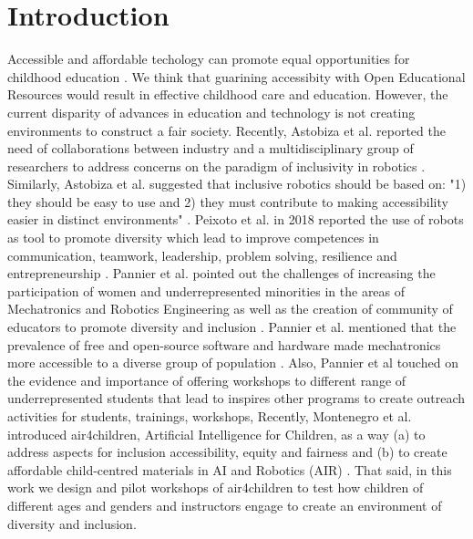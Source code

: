 \documentclass[conference]{IEEEtran}
\begin{document}
\section{Introduction}
Accessible and affordable techology can promote equal opportunities for childhood education \cite{yoshie2021-unesco}.
We think that guarining accessibity with Open Educational Resources would result in effective childhood care and education.
However, the current disparity of advances in education and technology is not creating environments to construct a fair society.
Recently, Astobiza et al. reported the need of collaborations between industry and a multidisciplinary group of researchers to address concerns on the paradigm of inclusivity in robotics \cite{MonasterioAstobiza2019}.
Similarly, Astobiza et al. suggested that inclusive robotics should be based on: "1) they should be easy to use and 2) they must contribute to making accessibility easier in distinct environments" \cite{MonasterioAstobiza2019}.
Peixoto et al. in 2018 reported the use of robots as tool to promote diversity which lead to improve competences in communication, teamwork, leadership, problem solving, resilience and entrepreneurship \cite{PeixotoCastro2018, PeixotoGonzalez2018}. 
Pannier et al. pointed out the challenges of increasing the  participation of women and underrepresented minorities in the areas of Mechatronics and Robotics Engineering as well as the creation of community of educators to promote diversity and inclusion \cite{Pannier2020}.
Pannier et al. mentioned that the prevalence of free and open-source software and hardware made mechatronics more accessible to a diverse group of population \cite{Pannier2020}.
Also, Pannier et al touched on the evidence and importance of offering workshops to different range of underrepresented students that lead to inspires other programs to create outreach activities for students, trainings, workshops, 
Recently, Montenegro et al. introduced air4children, Artificial Intelligence for Children, as a way  (a) to address aspects for inclusion accessibility, equity and fairness and (b) to create affordable child-centred materials in AI and Robotics (AIR) \cite{montenegro2021air4children}. 
That said, in this work we design and pilot workshops of air4children to test how children of different ages and genders and instructors engage to create an environment of diversity and inclusion. 

\end{document}
